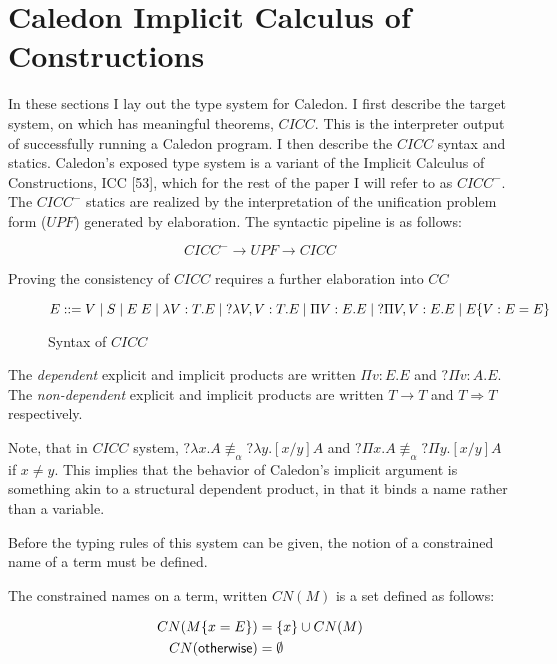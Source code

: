 
\newtheorem{tcases}{Case}


\section{Caledon Implicit Calculus of Constructions}


In these sections I lay out the type system for Caledon. I first describe the target system,
on which has meaningful theorems, $CICC$. 
This is the interpreter output of successfully running a Caledon program. 
I then describe the $CICC$ syntax and statics. 
Caledon’s exposed type system is a variant of the Implicit Calculus of Constructions, ICC [53],
which for the rest of the paper I will refer to as $CICC^-$. The $CICC^-$ statics are realized
by the interpretation of the unification problem form ($UPF$) generated by elaboration.
The syntactic pipeline is as follows:


\[
CICC^- \rightarrow UPF \rightarrow CICC
\]

Proving the consistency of $CICC$ requires a further elaboration into $CC$

\begin{figure}[H]
\[ 
E ::= 
V 
\; | \; S 
\; | \; E\;E 
\; | \; \lambda V : T. E 
\; | \; ?\lambda V,V : T. E 
\; | \; \Pi V : E . E 
\; | \; ?\Pi V,V : E . E 
\; | \; E \{ V : E = E \}
\]

\caption{Syntax of $CICC$}
\label{cicc:syntax}
\end{figure}

The \textit{dependent} explicit and implicit products are written $\Pi v : E . E $ and $?\Pi v : A . E$. 
The \textit{non-dependent} explicit and implicit products are written $T \rightarrow T$ 
and $T \Rightarrow T$ respectively.

Note, that in $CICC$ system, $?\lambda x . A \not\equiv_\alpha ?\lambda y . [x / y] A$ 
and $?\Pi x . A \not\equiv_\alpha ?\Pi y . [x / y] A$  if $x \neq y$.  
This implies that the behavior of Caledon's implicit argument is something akin to a structural dependent product, in that it binds a name rather than a variable.   

Before the typing rules of this system can be given, the notion of a constrained name of a term must be defined.

\begin{definition}
The constrained names on a term, written $CN(M)$ is a set defined as follows:

\begin{align}
CN(M \{ x = E \}) &= \{ x \} \cup CN(M)
\\
CN(\mathsf{otherwise}) &= \emptyset
\end{align}

\end{definition}

